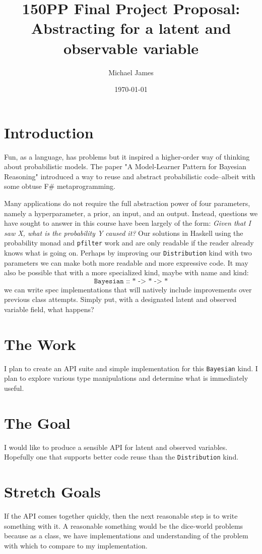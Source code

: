 \documentclass[11pt,twocolumn]{article}
\title{150PP Final Project Proposal: \\
Abstracting for a latent and observable variable}
\author{Michael James}
\date{\today}
\begin{document}
   \maketitle
\section{Introduction}
Fun, as a language, has problems but it inspired a higher-order way of thinking about probabilistic models. The paper "A Model-Learner Pattern for Bayesian Reasoning" introduced a way to reuse and abstract probabilistic code--albeit with some obtuse F\# metaprogramming.

Many applications do not require the full abstraction power of four parameters, namely a hyperparameter, a prior, an input, and an output. Instead, questions we have sought to answer in this course have been largely of the form: \textit{Given that I saw X, what is the probability Y caused it?} Our solutions in Haskell using the probability monad and \texttt{pfilter} work and are only readable if the reader already knows what is going on. Perhaps by improving our \texttt{Distribution} kind with two parameters we can make both more readable and more expressive code. It may also be possible that with a more specialized kind, maybe with name and kind: $$\texttt{Bayesian :: * -> * -> *}$$ we can write spec implementations that will natively include improvements over previous class attempts. Simply put, with a designated latent and observed variable field, what happens?

\section{The Work}
I plan to create an API suite and simple implementation for this \texttt{Bayesian} kind. I plan to explore various type manipulations and determine what is immediately useful.

\section{The Goal}
I would like to produce a sensible API for latent and observed variables. Hopefully one that supports better code reuse than the \texttt{Distribution} kind.

\section{Stretch Goals}
If the API comes together quickly, then the next reasonable step is to write something with it. A reasonable something would be the dice-world problems because as a class, we have implementations and understanding of the problem with which to compare to my implementation.
\end{document}
